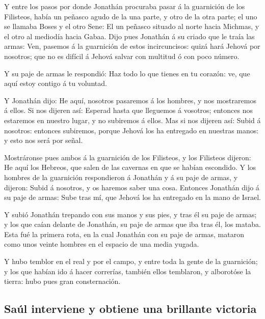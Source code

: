  Y entre los pasos por donde Jonathán procuraba pasar á la
guarnición de los Filisteos, había un peñasco agudo de la una parte, y
otro de la otra parte; el uno se llamaba Boses y el otro Sene:
 El un peñasco situado al norte hacia Michmas, y el otro
al mediodía hacia Gabaa.  Dijo pues Jonathán á su criado
que le traía las armas: Ven, pasemos á la guarnición de estos
incircuncisos: quizá hará Jehová por nosotros; que no es difícil á
Jehová salvar con multitud ó con poco número.

 Y su paje de armas le respondió: Haz todo lo que tienes
en tu corazón: ve, que aquí estoy contigo á tu voluntad.

 Y Jonathán dijo: He aquí, nosotros pasaremos á los
hombres, y nos mostraremos á ellos.  Si nos dijeren así:
Esperad hasta que lleguemos á vosotros; entonces nos estaremos en
nuestro lugar, y no subiremos á ellos.  Mas si nos
dijeren así: Subid á nosotros: entonces subiremos, porque Jehová los ha
entregado en nuestras manos: y esto nos será por señal.

 Mostráronse pues ambos á la guarnición de los Filisteos,
y los Filisteos dijeron: He aquí los Hebreos, que salen de las cavernas
en que se habían escondido.  Y los hombres de la
guarnición respondieron á Jonathán y á su paje de armas, y dijeron:
Subid á nosotros, y os haremos saber una cosa. Entonces Jonathán dijo á
su paje de armas: Sube tras mí, que Jehová los ha entregado en la mano
de Israel.

 Y subió Jonathán trepando con sus manos y sus pies, y
tras él su paje de armas; y los que caían delante de Jonathán, su paje
de armas que iba tras él, los mataba.  Esta fué la
primera rota, en la cual Jonathán con su paje de armas, mataron como
unos veinte hombres en el espacio de una media yugada.

 Y hubo temblor en el real y por el campo, y entre toda
la gente de la guarnición; y los que habían ido á hacer correrías,
también ellos temblaron, y alborotóse la tierra: hubo pues gran
consternación.

\hypertarget{sauxfal-interviene-y-obtiene-una-brillante-victoria}{%
\subsection{Saúl interviene y obtiene una brillante
victoria}\label{sauxfal-interviene-y-obtiene-una-brillante-victoria}}

